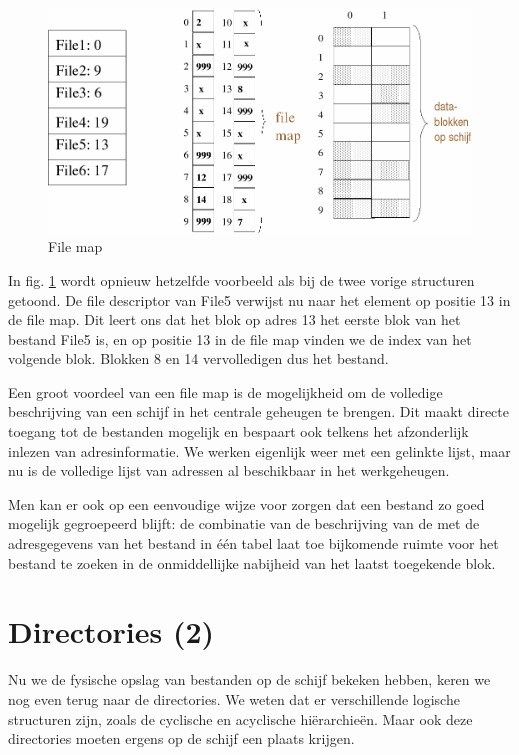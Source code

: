 \begin{figure}
\begin{center}
\includegraphics[width=\textwidth]{images/fig0413.png}
\caption{File map}
\label{filemap}
\end{center}
\end{figure}

In fig. \ref{filemap} wordt opnieuw hetzelfde voorbeeld als bij de twee vorige
structuren getoond. De file descriptor van File5 verwijst nu naar het element
op positie 13 in de file map. Dit leert ons dat het blok op adres 13
het eerste blok van het bestand File5 is, en op positie 13 in de file
map vinden we de index van het volgende blok. Blokken 8 en 14
vervolledigen dus het bestand.

Een groot voordeel van een file map is de mogelijkheid om de
volledige beschrijving van een schijf in het centrale geheugen te
brengen. Dit maakt directe toegang tot de bestanden mogelijk en
bespaart ook telkens het afzonderlijk inlezen van adresinformatie. We
werken eigenlijk weer met een gelinkte lijst, maar nu is de volledige
lijst van adressen al beschikbaar in het werkgeheugen.

Men kan er ook op een eenvoudige wijze voor zorgen dat een
bestand zo goed mogelijk gegroepeerd blijft: de combinatie van de
beschrijving van de met de adresgegevens van het bestand in \'e\'en tabel
laat toe bijkomende ruimte voor het bestand te zoeken in de
onmiddellijke nabijheid van het laatst toegekende blok.

\section{Directories (2)}

Nu we de fysische opslag van bestanden op de schijf bekeken
hebben, keren we nog even terug naar de directories. We weten dat er
verschillende logische structuren zijn, zoals de cyclische en acyclische
hi\"erarchie\"en. Maar ook deze directories moeten ergens op de schijf een
plaats krijgen.

